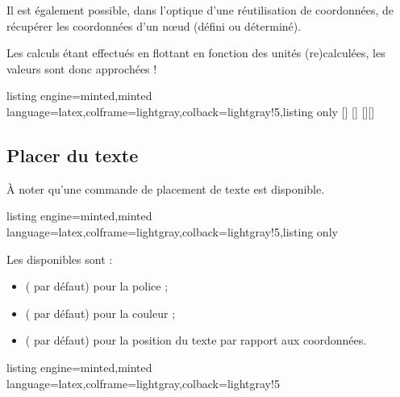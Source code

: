 \documentclass[11pt,a4paper]{ltxdoc}
\begin{document}
Il est également possible, dans l'optique d'une réutilisation de coordonnées, de récupérer les coordonnées d'un nœud (défini ou déterminé).

\smallskip

Les calculs étant effectués en flottant en fonction des unités (re)calculées, les valeurs sont donc approchées !

\begin{tcblisting}{listing engine=minted,minted language=latex,colframe=lightgray,colback=lightgray!5,listing only}
[\macrox]
[\macroy]
[\macrox][\macroy]
\end{tcblisting}

\subsection{Placer du texte}\label{placetxt}

À noter qu'une commande de placement de texte est disponible.

\begin{tcblisting}{listing engine=minted,minted language=latex,colframe=lightgray,colback=lightgray!5,listing only}
\end{tcblisting}

Les \MontreCode{[clés]} disponibles sont :

\begin{itemize}
  \item {} ( par défaut) pour la police ;
  \item {} ( par défaut) pour la couleur ;
  \item {} ( par défaut) pour la position du texte par rapport aux coordonnées.
\end{itemize}

\begin{tcblisting}{listing engine=minted,minted language=latex,colframe=lightgray,colback=lightgray!5}
  \begin{GraphiqueTikz}[x=1cm,y=1cm,Xmin=0,Xmax=5,Ymin=0,Ymax=1]
  \end{GraphiqueTikz}
\end{tcblisting}
\end{document}
